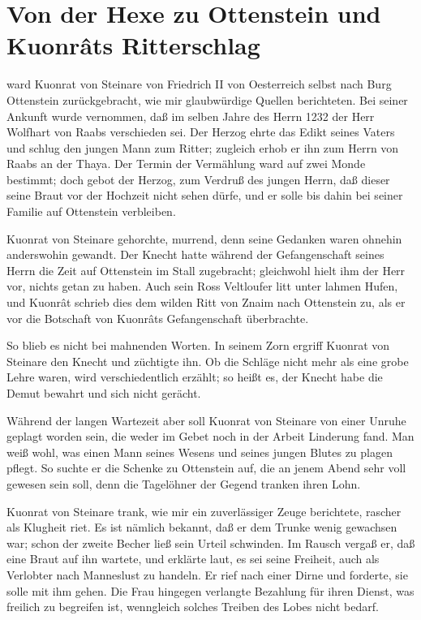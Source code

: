 
\section{Von der Hexe zu Ottenstein und Kuonr\^{a}ts Ritterschlag}

 ward \gls{Kuonrat von Steinare} von \gls{Friedrich II von Oesterreich} selbst nach Burg Ottenstein zurückgebracht, wie mir glaubwürdige Quellen berichteten. Bei seiner Ankunft wurde vernommen, daß im selben Jahre des Herrn 1232 der Herr \gls{Wolfhart von Raabs} verschieden sei. Der Herzog ehrte das Edikt seines Vaters und schlug den jungen Mann zum Ritter; zugleich erhob er ihn zum Herrn von \gls{Raabs an der Thaya}. Der Termin der Vermählung ward auf zwei Monde bestimmt; doch gebot der Herzog, zum Verdruß des jungen Herrn, daß dieser seine Braut vor der Hochzeit nicht sehen dürfe, und er solle bis dahin bei seiner Familie auf Ottenstein verbleiben.

\gls{Kuonrat von Steinare} gehorchte, murrend, denn seine Gedanken waren ohnehin anderswohin gewandt. Der \gls{Knecht} hatte während der Gefangenschaft seines Herrn die Zeit auf Ottenstein im Stall zugebracht; gleichwohl hielt ihm der Herr vor, nichts getan zu haben. Auch sein Ross \gls{Veltloufer} litt unter lahmen Hufen, und Kuonr\^{a}t schrieb dies dem wilden Ritt von \gls{Znaim} nach Ottenstein zu, als er vor die Botschaft von Kuonr\^{a}ts Gefangenschaft überbrachte.

So blieb es nicht bei mahnenden Worten. In seinem Zorn ergriff \gls{Kuonrat von Steinare} den \gls{Knecht} und züchtigte ihn. Ob die Schläge nicht mehr als eine grobe Lehre waren, wird verschiedentlich erzählt; so heißt es, der Knecht habe die Demut bewahrt und sich nicht gerächt.

Während der langen Wartezeit aber soll \gls{Kuonrat von Steinare} von einer Unruhe geplagt worden sein, die weder im Gebet noch in der Arbeit Linderung fand. Man weiß wohl, was einen Mann seines Wesens und seines jungen Blutes zu plagen pflegt. So suchte er die \gls{Schenke} zu Ottenstein auf, die an jenem Abend sehr voll gewesen sein soll, denn die Tagelöhner der Gegend tranken ihren Lohn.

\gls{Kuonrat von Steinare} trank, wie mir ein zuverlässiger Zeuge berichtete, rascher als Klugheit riet. Es ist nämlich bekannt, daß er dem Trunke wenig gewachsen war; schon der zweite Becher ließ sein Urteil schwinden. Im Rausch vergaß er, daß eine Braut auf ihn wartete, und erklärte laut, es sei seine \gls{Freiheit}, auch als Verlobter nach Manneslust zu handeln. Er rief nach einer Dirne und forderte, sie solle mit ihm gehen. Die Frau hingegen verlangte Bezahlung für ihren Dienst, was freilich zu begreifen ist, wenngleich solches Treiben des Lobes nicht bedarf.

